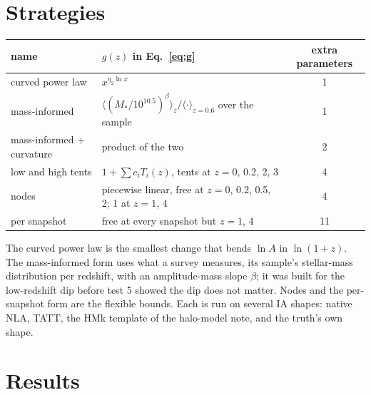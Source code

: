 \documentclass[11pt]{article}
\begin{document}
\section{Strategies}

\begin{center}
\small
\begin{tabular}{llc}
\toprule
name & $g(z)$ in Eq.~\eqref{eq:g} & extra parameters \\
\midrule
curved power law & $x^{\eta_2\ln x}$ & 1 \\
mass-informed & $\langle(M_*/10^{10.5})^\beta\rangle_z/\langle\cdot\rangle_{z=0.6}$ over the sample & 1 \\
mass-informed + curvature & product of the two & 2 \\
low and high tents & $1+\sum c_iT_i(z)$, tents at $z=0$, 0.2, 2, 3 & 4 \\
nodes & piecewise linear, free at $z=0$, 0.2, 0.5, 2; 1 at $z=1$, 4 & 4 \\
per snapshot & free at every snapshot but $z=1$, 4 & 11 \\
\bottomrule
\end{tabular}
\end{center}

The curved power law is the smallest change that bends $\ln A$ in
$\ln(1+z)$. The mass-informed form uses what a survey measures, its
sample's stellar-mass distribution per redshift, with an amplitude-mass
slope $\beta$; it was built for the low-redshift dip before test 5 showed
the dip does not matter. Nodes and the per-snapshot form are the flexible
bounds. Each is run on several IA shapes: native NLA, TATT, the HMk
template of the halo-model note, and the truth's own shape.

\section{Results}
\label{sec:results}
\end{document}
